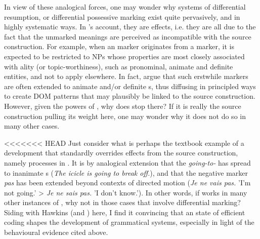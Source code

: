 \documentclass[output=paper]{langsci/langscibook}
\begin{document}
In view of these analogical forces, one may wonder why systems of differential resumption,  or differential possessive marking exist quite pervasively, and in highly systematic ways. In ’s account, they are  effects, i.e. they are all due to the fact that the unmarked meanings are perceived as incompatible with the source construction. For example, when an  marker originates from a  marker, it is expected to be restricted to  NPs whose properties are most closely associated with ality (or topic-worthiness), such as pronominal, animate and definite entities, and not to apply elsewhere. In fact, \citet{DalrympleNikolaeva2011} argue that such erstwhile  markers are often extended to animate and/or definite s, thus diffusing in principled ways to create DOM patterns that may plausibly be linked to the source construction. However, given the powers of , why does  stop there? If it is really the source construction pulling its weight here, one may wonder why it does not do so in many other cases. 

\largerpage
<<<<<<< HEAD
Just consider what is perhaps the textbook example of a development that standardly overrides effects from the source construction, namely  processes in . It is by analogical extension that the \textit{going-to-} has spread to inanimate s (\textit{The icicle is going to break off.}), and that the  negative marker \textit{pas} has been extended beyond contexts of directed motion (\textit{Je ne vais pas.} 'I'm not going.' > \textit{Je ne sais pas.} 'I don't know.'). In other words, if  works in many other instances of , why not in those cases that involve differential marking? Siding with Hawkins (and ) here, I find it convincing that an  state of efficient coding shapes the development of grammatical systems, especially in light of the behavioural evidence cited above.
\end{document}
